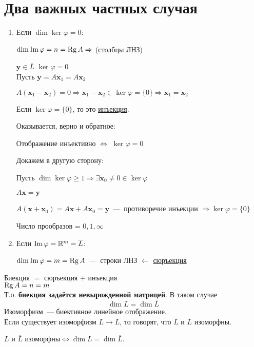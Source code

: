 \section{Два важных частных случая}

\begin{enumerate}
	\item Если \underline{$\dim\ker\varphi=0$}:
	
	$\dim \operatorname{\mathop{Im}} \varphi = n = \operatorname{\mathop{Rg}} A \Rightarrow$ (столбцы ЛНЗ)
	
	$\textbf{y} \in \overline{L}$
	$\ker\varphi = {0}$\\
	Пусть $\textbf{y}=A\textbf{x$_1$}=A\textbf{x$_2$}$
	
	$A(\textbf{x$_1$}-\textbf{x$_2$}) = 0 \Rightarrow \textbf{x$_1$} - \textbf{x$_2$} \in \ker\varphi =\{0\} \Rightarrow \textbf{x$_1$}=\textbf{x$_2$}$
	
	Если $\ker\varphi = \{0\}$, то это \underline{инъекция}.
	
	Оказывается, верно и обратное:
	
	Отображение инъективно $\Leftrightarrow$ $\ker\varphi = {0}$
	
	Докажем в другую сторону:
	
	Пусть $\dim\ker \varphi \geq 1  \Rightarrow \exists \textbf{x$_0$} \neq 0 \in \ker \varphi$
	
	$A\textbf{x}=\textbf{y}$
	
	$A(\textbf{x}+\textbf{x$_0$}) = A\textbf{x}+A\textbf{x$_0$} = \textbf{y}$~---~противоречие инъекции $\Rightarrow \ker\varphi = \{0\}$
	
	Число прообразов = $0, 1, \infty$
	\item Если \underline{$\operatorname{\mathop{Im}}\varphi = \mathbb{R}^m = \overline{L}$}:
	
	$\dim \operatorname{\mathop{Im}}\varphi = m = \operatorname{\mathop{Rg}} A$~---~строки ЛНЗ $\leftarrow$ \underline{сюръекция}
\end{enumerate}
Биекция $=$ сюръекция $+$ инъекция\\
$\operatorname{\mathop{Rg}} A=n=m$\\
Т.о. \textbf{биекция задаётся невырожденной матрицей}. В таком случае
$$\dim L = \dim \overline L$$
\textsf{Изоморфизм}~--- биективное линейное отображение.\\
Если существует изоморфизм $L \to \overline L$, то говорят, что $L$ и $\overline L$ \textsf{изоморфны}.

\begin{theorem}
	$L$ и $\overline L$ изоморфны$\iff \dim L =
	\dim \overline L$.
\end{theorem}

